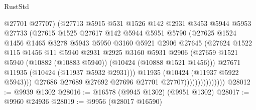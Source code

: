 \begin{lexlean}{RustStd}
\begin{coremodule}
                                @27701
                                @27707)
                              (@27713
                                @5915
                                @531
                                @1526
                                @142
                                @2931
                                @3453
                                @5944
                                @5953
                                @27733
                                (@27615
                                  @1525
                                  @27617
                                  @142
                                  @5944
                                  @5951
                                  @5790
                                  (@27625
                                    @1524
                                    @1456
                                    @1465
                                    @3278
                                    @5943
                                    @5950
                                    @3160
                                    @5921
                                    @2906
                                    @27645
                                    (@27624
                                      @1522
                                      @115
                                      @1456
                                      @11
                                      @5940
                                      @2931
                                      @2925
                                      @3160
                                      @5931
                                      @2906
                                      (@27659
                                        @1521
                                        @5940
                                        (@10882 (@10883 @5940))
                                        (@10424 (@10888 @1521 @1456)))
                                      @27671
                                      @11935
                                      (@10424 (@11937 @5932 @2931)))
                                    @11935
                                    (@10424 (@11937 @5922 @5943)))
                                  @27686
                                  @27689
                                  @27692
                                  @27696
                                  @27701
                                  @27707)))))))))))))))
@28012 := @9939 @1302
@28016 := @16578 (@9945 @1302) (@9951 @1302)
@28017 := @9960 @24936
@28019 := @9956 (@28017 @16590)

\end{coremodule}
\end{lexlean}
